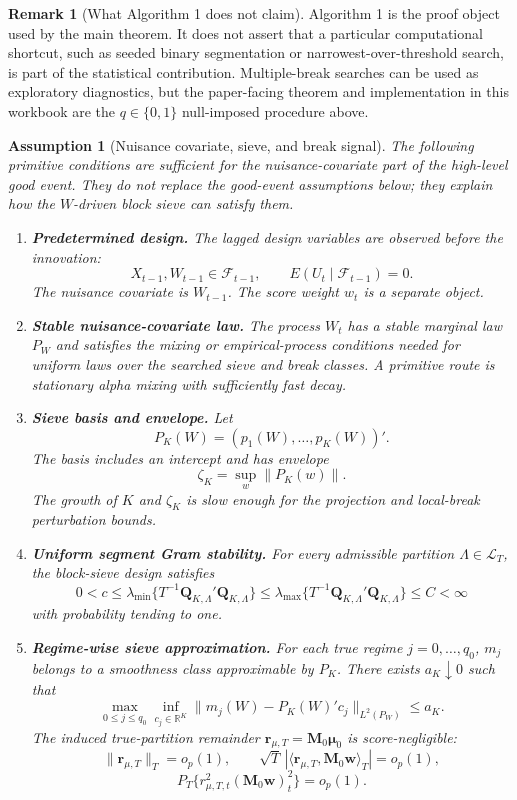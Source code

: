 \documentclass[12pt]{article}
\numberwithin{equation}{section}
\newtheorem{assumption}{Assumption}
\theoremstyle{definition}
\newtheorem{remark}{Remark}
\newcommand{\innerT}[2]{\langle #1,#2\rangle_T}
\begin{document}
\begin{remark}[What Algorithm 1 does not claim]
Algorithm 1 is the proof object used by the main theorem. It does not assert
that a particular computational shortcut, such as seeded binary segmentation or
narrowest-over-threshold search, is part of the statistical contribution.
Multiple-break searches can be used as exploratory diagnostics, but the
paper-facing theorem and implementation in this workbook are the
\(q\in\{0,1\}\) null-imposed procedure above.
\end{remark}

\begin{assumption}[Nuisance covariate, sieve, and break signal]
\label{ass:nuisance-covariate-sieve}
The following primitive conditions are sufficient for the nuisance-covariate
part of the high-level good event. They do not replace the good-event
assumptions below; they explain how the \(W\)-driven block sieve can satisfy
them.
\begin{enumerate}[leftmargin=2em]
\item \textbf{Predetermined design.} The lagged design variables are observed
before the innovation:
\[
    X_{t-1},W_{t-1}\in\mathcal F_{t-1},
    \qquad
    E(U_t\mid\mathcal F_{t-1})=0.
\]
The nuisance covariate is \(W_{t-1}\). The score weight \(w_t\) is a separate
object.

\item \textbf{Stable nuisance-covariate law.} The process \(W_t\) has a stable
marginal law \(P_W\) and satisfies the mixing or empirical-process conditions
needed for uniform laws over the searched sieve and break classes. A primitive
route is stationary alpha mixing with sufficiently fast decay.

\item \textbf{Sieve basis and envelope.} Let
\[
    P_K(W)=(p_1(W),\ldots,p_K(W))'.
\]
The basis includes an intercept and has envelope
\[
    \zeta_K=\sup_w \|P_K(w)\|.
\]
The growth of \(K\) and \(\zeta_K\) is slow enough for the projection and
local-break perturbation bounds.

\item \textbf{Uniform segment Gram stability.} For every admissible
partition \(\Lambda\in\mathcal L_T\), the block-sieve design satisfies
\[
    0<c\le
    \lambda_{\min}\{T^{-1}\bm Q_{K,\Lambda}'\bm Q_{K,\Lambda}\}
    \le
    \lambda_{\max}\{T^{-1}\bm Q_{K,\Lambda}'\bm Q_{K,\Lambda}\}
    \le C<\infty
\]
with probability tending to one.

\item \textbf{Regime-wise sieve approximation.} For each true regime
\(j=0,\ldots,q_0\), \(m_j\) belongs to a smoothness class approximable by
\(P_K\). There exists \(a_K\downarrow0\) such that
\[
    \max_{0\le j\le q_0}
    \inf_{c_j\in\mathbb R^K}
    \|m_j(W)-P_K(W)'c_j\|_{L^2(P_W)}
    \le a_K.
\]
The induced true-partition remainder
\(\bm r_{\mu,T}=\bm M_0\bm\mu_0\) is score-negligible:
\[
    \|\bm r_{\mu,T}\|_T=o_p(1),
    \qquad
    \sqrt T\,|\innerT{\bm r_{\mu,T}}{\bm M_0\bm w}|=o_p(1),
\]
\[
    P_T\{r_{\mu,T,t}^2(\bm M_0\bm w)_t^2\}=o_p(1).
\]


\end{enumerate}
\end{assumption}
\end{document}
